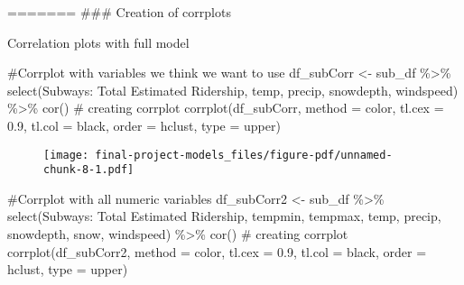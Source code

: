 \documentclass[
  letterpaper,
  DIV=11,
  numbers=noendperiod]{scrartcl}
\newenvironment{Shaded}{\begin{snugshade}}{\end{snugshade}}
\newcommand{\AttributeTok}[1]{\textcolor[rgb]{0.40,0.45,0.13}{#1}}
\newcommand{\CommentTok}[1]{\textcolor[rgb]{0.37,0.37,0.37}{#1}}
\newcommand{\FloatTok}[1]{\textcolor[rgb]{0.68,0.00,0.00}{#1}}
\newcommand{\FunctionTok}[1]{\textcolor[rgb]{0.28,0.35,0.67}{#1}}
\newcommand{\NormalTok}[1]{\textcolor[rgb]{0.00,0.23,0.31}{#1}}
\newcommand{\OtherTok}[1]{\textcolor[rgb]{0.00,0.23,0.31}{#1}}
\newcommand{\SpecialCharTok}[1]{\textcolor[rgb]{0.37,0.37,0.37}{#1}}
\newcommand{\StringTok}[1]{\textcolor[rgb]{0.13,0.47,0.30}{#1}}
\begin{document}
======= \#\#\# Creation of corrplots

Correlation plots with full model

\begin{Shaded}
\begin{Highlighting}[]
\CommentTok{\#Corrplot with variables we think we want to use}
\NormalTok{df\_subCorr }\OtherTok{\textless{}{-}}\NormalTok{ sub\_df }\SpecialCharTok{\%\textgreater{}\%}
  \FunctionTok{select}\NormalTok{(}\StringTok{\textasciigrave{}}\AttributeTok{Subways: Total Estimated Ridership}\StringTok{\textasciigrave{}}\NormalTok{, temp, precip, snowdepth, windspeed) }\SpecialCharTok{\%\textgreater{}\%}
  \FunctionTok{cor}\NormalTok{() }
\CommentTok{\# creating corrplot}
\FunctionTok{corrplot}\NormalTok{(df\_subCorr, }\AttributeTok{method =} \StringTok{\textquotesingle{}color\textquotesingle{}}\NormalTok{, }\AttributeTok{tl.cex =} \FloatTok{0.9}\NormalTok{, }\AttributeTok{tl.col =} \StringTok{\textquotesingle{}black\textquotesingle{}}\NormalTok{,}
\AttributeTok{order =} \StringTok{\textquotesingle{}hclust\textquotesingle{}}\NormalTok{, }\AttributeTok{type =} \StringTok{\textquotesingle{}upper\textquotesingle{}}\NormalTok{)}
\end{Highlighting}
\end{Shaded}

\begin{figure}[H]

{\centering \texttt{[image: final-project-models\_files/figure-pdf/unnamed-chunk-8-1.pdf]}

}

\end{figure}

\begin{Shaded}
\begin{Highlighting}[]
\CommentTok{\#Corrplot with all numeric variables}
\NormalTok{df\_subCorr2 }\OtherTok{\textless{}{-}}\NormalTok{ sub\_df }\SpecialCharTok{\%\textgreater{}\%}
  \FunctionTok{select}\NormalTok{(}\StringTok{\textasciigrave{}}\AttributeTok{Subways: Total Estimated Ridership}\StringTok{\textasciigrave{}}\NormalTok{, tempmin, tempmax, temp, precip, snowdepth, snow, windspeed) }\SpecialCharTok{\%\textgreater{}\%}
  \FunctionTok{cor}\NormalTok{()}
\CommentTok{\# creating corrplot}
\FunctionTok{corrplot}\NormalTok{(df\_subCorr2, }\AttributeTok{method =} \StringTok{\textquotesingle{}color\textquotesingle{}}\NormalTok{, }\AttributeTok{tl.cex =} \FloatTok{0.9}\NormalTok{, }\AttributeTok{tl.col =} \StringTok{\textquotesingle{}black\textquotesingle{}}\NormalTok{,}
\AttributeTok{order =} \StringTok{\textquotesingle{}hclust\textquotesingle{}}\NormalTok{, }\AttributeTok{type =} \StringTok{\textquotesingle{}upper\textquotesingle{}}\NormalTok{)}
\end{Highlighting}
\end{Shaded}
\end{document}
